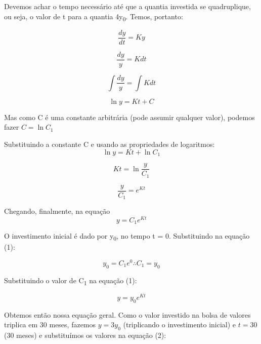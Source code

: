 \documentclass{beamer}
\begin{document}
		\begin{frame}
		Devemos achar o tempo necessário até que a quantia investida se quadruplique, ou seja, o valor de t para a quantia 4y\textsubscript{0}. Temos, portanto:
		
		 \begin{displaymath}
		 \frac{dy}{dt} = Ky
		 \end{displaymath} \pause
		 
		 \begin{displaymath}
		 	 \frac{dy}{y} = K dt
		 \end{displaymath} \pause
		 
		 \begin{displaymath}
		 \int \frac{dy}{y} = \int K dt
		 \end{displaymath} \pause
		 
		 \begin{displaymath}
		 	\ln y = Kt + C
		 \end{displaymath} \pause
		 
		 Mas como C é uma constante arbitrária (pode assumir qualquer valor), podemos fazer \(C = \ln C_{1}\)
	\end{frame}
	
	\begin{frame}
		Substituindo a constante C e usando as propriedades de logaritmos: 
		\begin{displaymath}
			\ln y = Kt + \ln C_{1}
		\end{displaymath} \pause
		
		\begin{displaymath}
			Kt = \ln \frac{y}{C_{1}}
		\end{displaymath} \pause
		
		\begin{displaymath}
			\frac{y}{C_{1}} = e^{Kt}
		\end{displaymath} \pause
		
		
		Chegando, finalmente, na equação
		\begin{equation}
			\boxed{ y = C_{1}e^{Kt} }
		\end{equation}	
	\end{frame}
	
	\begin{frame}
		O investimento inicial é dado por y\textsubscript{0}, no tempo t = 0. Substituindo na equação (1):
		
		\begin{displaymath}
		y_{0} = C_{1}e^0 \therefore	C_{1} = y_{0}
		\end{displaymath} \pause
		
		Substituindo o valor de C\textsubscript{1} na equação (1):
		
		\begin{equation}
			\boxed{ y = y_{0}e^{Kt} }
		\end{equation}
		
		Obtemos então nossa equação geral. Como o valor investido na bolsa de valores triplica em 30 meses, fazemos \(y = 3y_0\) (triplicando o investimento inicial) e \(t = 30\) (30 meses) e substituímos os valores na equação (2):
	\end{frame}
\end{document}
